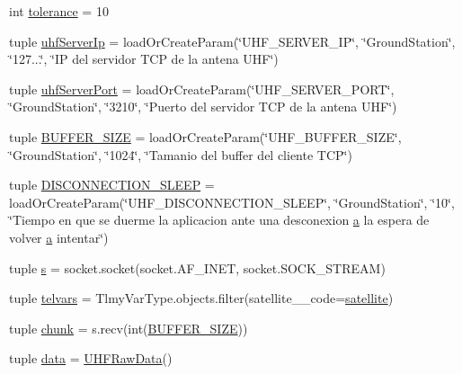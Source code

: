 \begin{DoxyCompactItemize}
\item 
int \hyperlink{namespace_tlmy_cmd_processor_1_1_tlmy_cmd_processor_afb50f24734d74f88dacebcac995fd9f4}{tolerance} = 10
\item 
tuple \hyperlink{namespace_tlmy_cmd_processor_1_1_tlmy_cmd_processor_ad1afaadb14f89dfd6adce55457a89fa4}{uhf\+Server\+Ip} = load\+Or\+Create\+Param(\char`\"{}U\+H\+F\+\_\+\+S\+E\+R\+V\+E\+R\+\_\+\+I\+P\char`\"{}, \char`\"{}Ground\+Station\char`\"{}, \char`\"{}127...\char`\"{}, \char`\"{}I\+P del servidor T\+C\+P de la antena U\+H\+F\char`\"{})
\item 
tuple \hyperlink{namespace_tlmy_cmd_processor_1_1_tlmy_cmd_processor_abc4f5193ae5293a175c24785f648c36f}{uhf\+Server\+Port} = load\+Or\+Create\+Param(\char`\"{}U\+H\+F\+\_\+\+S\+E\+R\+V\+E\+R\+\_\+\+P\+O\+R\+T\char`\"{}, \char`\"{}Ground\+Station\char`\"{}, \char`\"{}3210\char`\"{}, \char`\"{}Puerto del servidor T\+C\+P de la antena U\+H\+F\char`\"{})
\item 
tuple \hyperlink{namespace_tlmy_cmd_processor_1_1_tlmy_cmd_processor_ad6b870e079ada467cc4ac0b8f1f73039}{B\+U\+F\+F\+E\+R\+\_\+\+S\+I\+Z\+E} = load\+Or\+Create\+Param(\char`\"{}U\+H\+F\+\_\+\+B\+U\+F\+F\+E\+R\+\_\+\+S\+I\+Z\+E\char`\"{}, \char`\"{}Ground\+Station\char`\"{}, \char`\"{}1024\char`\"{}, \char`\"{}Tamanio del buffer del cliente T\+C\+P\char`\"{})
\item 
tuple \hyperlink{namespace_tlmy_cmd_processor_1_1_tlmy_cmd_processor_a053a883aeff5a224089cd5c791e2bc4c}{D\+I\+S\+C\+O\+N\+N\+E\+C\+T\+I\+O\+N\+\_\+\+S\+L\+E\+E\+P} = load\+Or\+Create\+Param(\char`\"{}U\+H\+F\+\_\+\+D\+I\+S\+C\+O\+N\+N\+E\+C\+T\+I\+O\+N\+\_\+\+S\+L\+E\+E\+P\char`\"{}, \char`\"{}Ground\+Station\char`\"{}, \char`\"{}10\char`\"{}, \char`\"{}Tiempo en que se duerme la aplicacion ante una desconexion \hyperlink{bootstrap_8min_8js_a9252b696bd8018d152e6640fcbe6e3b8}{a} la espera de volver \hyperlink{bootstrap_8min_8js_a9252b696bd8018d152e6640fcbe6e3b8}{a} intentar\char`\"{})
\item 
tuple \hyperlink{namespace_tlmy_cmd_processor_1_1_tlmy_cmd_processor_a5b740cec8cab496e71b6896c16dfba9d}{s} = socket.\+socket(socket.\+A\+F\+\_\+\+I\+N\+E\+T, socket.\+S\+O\+C\+K\+\_\+\+S\+T\+R\+E\+A\+M)
\item 
tuple \hyperlink{namespace_tlmy_cmd_processor_1_1_tlmy_cmd_processor_a9d8c45d2e203eaa7eb7be5ece0116d39}{telvars} = Tlmy\+Var\+Type.\+objects.\+filter(satellite\+\_\+\+\_\+code=\hyperlink{namespace_tlmy_cmd_processor_1_1_tlmy_cmd_processor_a5cf95a9cff868554c46d7a901df74673}{satellite})
\item 
tuple \hyperlink{namespace_tlmy_cmd_processor_1_1_tlmy_cmd_processor_a1ed237493e0f74a1a922ee4b54ef0657}{chunk} = s.\+recv(int(\hyperlink{namespace_tlmy_cmd_processor_1_1_tlmy_cmd_processor_ad6b870e079ada467cc4ac0b8f1f73039}{B\+U\+F\+F\+E\+R\+\_\+\+S\+I\+Z\+E}))
\item 
tuple \hyperlink{namespace_tlmy_cmd_processor_1_1_tlmy_cmd_processor_aa2dfd09891072d77d04b841a8bed1462}{data} = \hyperlink{class_ground_segment_1_1models_1_1_u_h_f_raw_data_1_1_u_h_f_raw_data}{U\+H\+F\+Raw\+Data}()
\end{DoxyCompactItemize}


